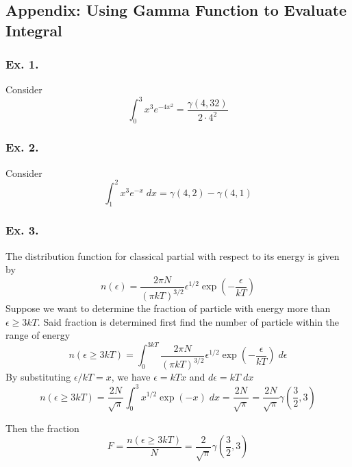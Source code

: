 \documentclass[../../main.tex]{subfiles}
\begin{document}
\subsection{Appendix: Using Gamma Function to Evaluate Integral}
\subsubsection{Ex. 1.} Consider
\begin{equation*}
    \int_{0}^{3}x^3e^{-4x^2}=\frac{\gamma(4,32)}{2\cdot4^2}
\end{equation*}

\subsubsection{Ex. 2.} Consider
\begin{equation*}
    \int_{1}^{2}x^3e^{-x}\;dx=\gamma(4,2)-\gamma(4,1)
\end{equation*}

\subsubsection{Ex. 3.} The distribution function for classical partial with respect to its energy is given by 
\begin{equation*}
    n(\epsilon)=\frac{2\pi N}{(\pi kT)^{3/2}}\epsilon^{1/2}\exp \left(-\frac{\epsilon}{kT}\right)
\end{equation*}
Suppose we want to determine the fraction of particle with energy more than $\epsilon \geq 3kT$. Said fraction is determined first find the number of particle within the range of energy
\begin{equation*}
    n(\epsilon \geq 3kT)=\int_{0}^{3kT}\frac{2\pi N}{(\pi kT)^{3/2}}\epsilon^{1/2}\exp \left(-\frac{\epsilon}{kT}\right)\;d\epsilon
\end{equation*}
By substituting $\epsilon/kT=x$, we have $\epsilon=kTx$ and $d\epsilon=kT\;dx$
\begin{equation*}
    n(\epsilon \geq 3kT)=\frac{2N}{\sqrt{\pi}}\int_{0}^{3}x^{1/2}\exp \left(-x\right)\;dx=\frac{2N}{\sqrt{\pi}}=\frac{2N}{\sqrt{\pi}}\gamma\left(\frac{3}{2},3\right)
\end{equation*}

Then the fraction
\begin{equation*}
    F=\frac{n(\epsilon \geq 3kT)}{N}=\frac{2}{\sqrt{\pi}}\gamma\left(\frac{3}{2},3\right)
\end{equation*}
\end{document}
